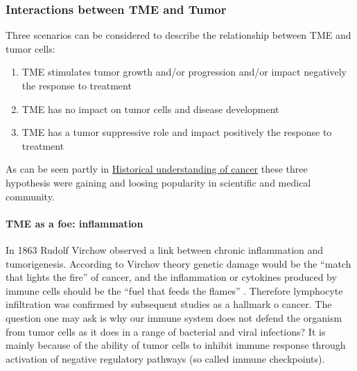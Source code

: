 \documentclass[12pt,]{book}
\providecommand{\tightlist}{%
  \setlength{\itemsep}{0pt}\setlength{\parskip}{0pt}}
\let\oldparagraph\paragraph
\renewcommand{\paragraph}[1]{\oldparagraph{#1}\mbox{}}
\theoremstyle{definition}
\theoremstyle{definition}
\theoremstyle{definition}
\theoremstyle{remark}
\begin{document}
\hypertarget{interactions-between-tme-and-tumor}{%
\subsubsection{Interactions between TME and
Tumor}\label{interactions-between-tme-and-tumor}}

Three scenarios can be considered to describe the relationship between
TME and tumor cells:

\begin{enumerate}
\def\labelenumi{\arabic{enumi}.}
\tightlist
\item
  TME stimulates tumor growth and/or progression and/or impact
  negatively the response to treatment
\item
  TME has no impact on tumor cells and disease development
\item
  TME has a tumor suppressive role and impact positively the response to
  treatment
\end{enumerate}

As can be seen partly in \protect\hyperlink{hist}{Historical
understanding of cancer} these three hypothesis were gaining and loosing
popularity in scientific and medical community.

\hypertarget{tme-as-a-foe-inflammation}{%
\paragraph{TME as a foe: inflammation}\label{tme-as-a-foe-inflammation}}

In 1863 Rudolf Virchow observed a link between chronic inflammation and
tumorigenesis. According to Virchov theory genetic damage would be the
``match that lights the fire'' of cancer, and the inflammation or
cytokines produced by immune cells should be the ``fuel that feeds the
flames'' \citep{Balkwill2001}. Therefore lymphocyte infiltration was
confirmed by subsequent studies as a hallmark o cancer. The question one
may ask is why our immune system does not defend the organism from tumor
cells as it does in a range of bacterial and viral infections? It is
mainly because of the ability of tumor cells to inhibit immune response
through activation of negative regulatory pathways (so called immune
checkpoints).
\end{document}
